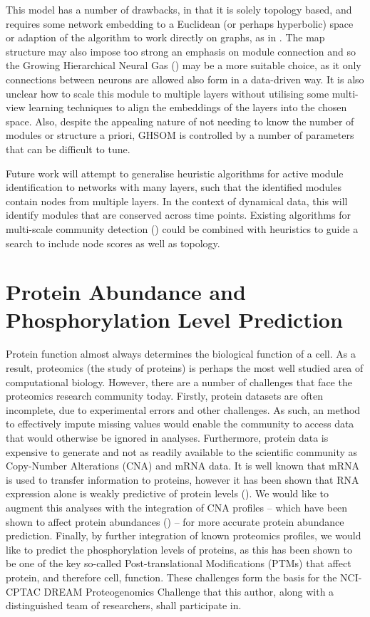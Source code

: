 \documentclass[
11pt, %
english, %
singlespacing, %
headsepline, %
]{MastersDoctoralThesis} %
\begin{document}
This model has a number of drawbacks, in that it is solely topology based, and requires some network embedding to a Euclidean (or perhaps hyperbolic) space or adaption of the algorithm to work directly on graphs, as in \cite{yamakawa2006self}. The map structure may also impose too strong an emphasis on module connection and so the Growing Hierarchical Neural Gas (\cite{palomo2016growing}) may be a more suitable choice, as it only connections between neurons are allowed also form in a data-driven way. It is also unclear how to scale this module to multiple layers without utilising some multi-view learning techniques to align the embeddings of the layers into the chosen space. Also, despite the appealing nature of not needing to know the number of modules or structure a priori, GHSOM is controlled by a number of parameters that can be difficult to tune.

Future work will attempt to generalise heuristic algorithms for active module identification to networks with many layers, such that the identified modules contain nodes from multiple layers. In the context of dynamical data, this will identify modules that are conserved across time points. Existing algorithms for multi-scale community detection (\cite{mucha2010community,ashourvan2017multi}) could be combined with heuristics to guide a search to include node scores as well as topology. 

\section{Protein Abundance and Phosphorylation Level Prediction}
Protein function almost always determines the biological function of a cell. As a result, proteomics (the study of proteins) is perhaps the most well studied area of computational biology. However, there are a number of challenges that face the proteomics research community today. Firstly, protein datasets are often incomplete, due to experimental errors and other challenges. As such, an method to effectively impute missing values would enable the community to access data that would otherwise be ignored in analyses. Furthermore, protein data is expensive to generate and not as readily available to the scientific community as Copy-Number Alterations (CNA) and mRNA data. It is well known that mRNA is used to transfer information to proteins, however it has been shown that RNA expression alone is weakly predictive of protein levels (\cite{vogel2012insights}). We would like to augment this analyses with the integration of CNA profiles -- which have been shown to affect protein abundances (\cite{zhang2016integrated}) -- for more accurate protein abundance prediction. Finally, by further integration of known proteomics profiles, we would like to predict the phosphorylation levels of proteins, as this has been shown to be one of the key so-called Post-translational Modifications (PTMs) that affect protein, and therefore cell, function. These challenges form the basis for the NCI-CPTAC DREAM Proteogenomics Challenge that this author, along with a distinguished team of researchers, shall participate in. 
\end{document}
